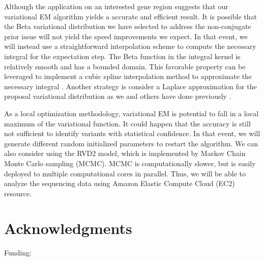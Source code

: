 \documentclass[11pt,reqno]{amsart}
\begin{document}
Although the application on an interested gene region suggests that our variational EM algorithm yields a accurate and efficient result.
It is possible that the Beta variational distribution we have selected to address the non-conjugate prior issue will not yield the speed improvements we expect.
In that event, we will instead use a straightforward interpolation scheme to compute the necessary integral for the expectation step.
The Beta function in the integral kernel is relatively smooth and has a bounded domain.
This favorable property can be leveraged to implement a cubic spline interpolation method to approximate the necessary integral \citep{mckinley1998cubic}.
Another strategy is consider a Laplace approximation for the proposal variational distribution as we and others have done previously \citep{saddiki2014glad, wang2013variational}.

As a local optimization methodology, variational EM is potential to fall in a local maximum of the variational function. It could happen that the accuracy is still not sufficient to identify variants with statistical confidence. In that event, we will generate different random initialized parameters to restart the algorithm. We can also consider using the RVD2 model, which is implemented by Markov Chain Monte Carlo sampling (MCMC). MCMC is computationally slower, but is easily deployed to multiple computational cores in parallel. Thus, we will be able to analyze the sequencing data using Amazon Elastic Compute Cloud (EC2) resource.

\section*{Acknowledgments}
Funding:


\appendix



\end{document}
